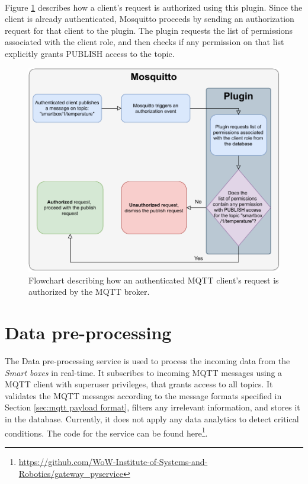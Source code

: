 \paragraph{} Figure \ref{fig:mqtt-plugin-authzflow} describes how a client's request is authorized using this plugin. Since the client is already authenticated, Mosquitto proceeds by sending an authorization request for that client to the plugin. The plugin requests the list of permissions associated with the client role, and then checks if any permission on that list explicitly grants PUBLISH access to the topic.

\begin{figure}[H]
    \centering
    \includegraphics[width=0.7\linewidth]{images/mqtt authorization.pdf}
    \caption{Flowchart describing how an authenticated \acs{MQTT} client's request is authorized by the \acs{MQTT} broker.}
    \label{fig:mqtt-plugin-authzflow}
\end{figure}
\section{Data pre-processing}

The Data pre-processing service is used to process the incoming data from the \textit{Smart boxes} in real-time. It subscribes to incoming \acs{MQTT} messages using a \acs{MQTT} client with superuser privileges, that grants access to all topics. It validates the \acs{MQTT} messages according to the message formats specified in Section \ref{sec:mqtt payload format}, filters any irrelevant information, and stores it in the database. Currently, it does not apply any data analytics to detect critical conditions. The code for the service can be found here\footnote{\url{https://github.com/WoW-Institute-of-Systems-and-Robotics/gateway_pyservice}}. 

